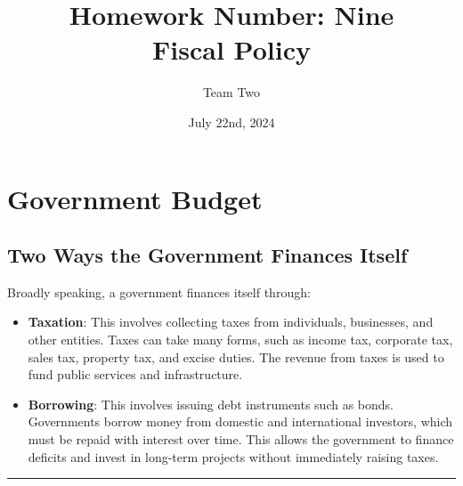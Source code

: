 \documentclass{article}
\title{Homework Number: Nine\\ \large Fiscal Policy}
\author{Team Two}
\date{July 22nd, 2024}
\begin{document}
\maketitle

\section{Government Budget}

\subsection{Two Ways the Government Finances Itself}
Broadly speaking, a government finances itself through:
\begin{itemize}
    \item \textbf{Taxation}: This involves collecting taxes from individuals, businesses, and other entities. Taxes can take many forms, such as income tax, corporate tax, sales tax, property tax, and excise duties. The revenue from taxes is used to fund public services and infrastructure.
    \item \textbf{Borrowing}: This involves issuing debt instruments such as bonds. Governments borrow money from domestic and international investors, which must be repaid with interest over time. This allows the government to finance deficits and invest in long-term projects without immediately raising taxes.
\end{itemize}

\noindent\rule{\linewidth}{0.5pt}
\end{document}
